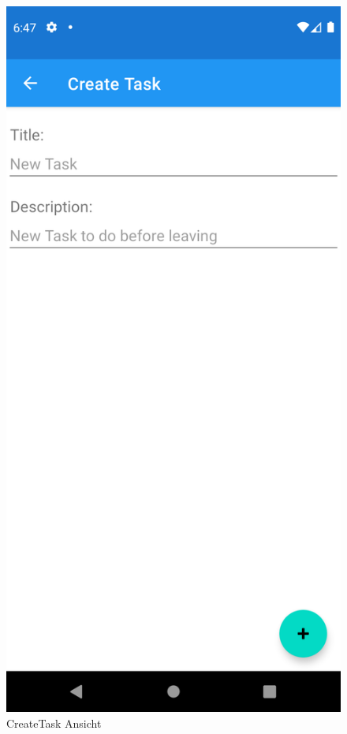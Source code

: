 \begin{figure}[h]
	\hfill
	\begin{minipage}{0.45\linewidth}
		\centering
		\includegraphics[width=.9\linewidth]{Bilder/CreateTask.png}
		\caption{CreateTask Ansicht}
		\label{fig:createTask}
	\end{minipage}
\end{figure}


